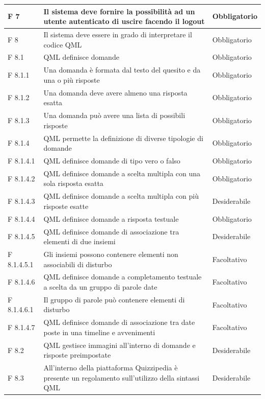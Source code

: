 \documentclass[a4paper,11pt]{article}
\begin{document}
\begin{longtable}{p{}p{}p{}}
\midrule
F 7 & Il sistema deve fornire la possibilità ad un utente autenticato di uscire facendo il logout & Obbligatorio\\
\midrule
F 8 & Il sistema deve essere in grado di interpretare il codice QML & Obbligatorio\\
\midrule
F 8.1 & QML definisce domande & Obbligatorio\\
\midrule
F 8.1.1 & Una domanda è formata dal testo del quesito e da una o più risposte & Obbligatorio\\
\midrule
F 8.1.2 & Una domanda deve avere almeno una risposta esatta & Obbligatorio\\
\midrule
F 8.1.3 & Una domanda può avere una lista di possibili risposte & Obbligatorio\\
\midrule
F 8.1.4 & QML permette la definizione di diverse tipologie di domande & Obbligatorio\\
\midrule
F 8.1.4.1 & QML definisce domande di tipo vero o falso & Obbligatorio\\
\midrule
F 8.1.4.2 & QML definisce domande a scelta multipla con una sola risposta esatta & Obbligatorio\\
\midrule
F 8.1.4.3 & QML definisce domande a scelta multipla con più risposte esatte & Desiderabile\\
\midrule
F 8.1.4.4 & QML definisce domande a risposta testuale & Obbligatorio\\
\midrule
F 8.1.4.5 & QML definisce domande di associazione tra elementi di due insiemi & Desiderabile\\
\midrule
F 8.1.4.5.1 & Gli insiemi possono contenere elementi non associabili di disturbo & Facoltativo\\
\midrule
F 8.1.4.6 & QML definisce domande a completamento testuale a scelta da un gruppo di parole date & Facoltativo\\
\midrule
F 8.1.4.6.1 & Il gruppo di parole può contenere elementi di disturbo & Facoltativo\\
\midrule
F 8.1.4.7 & QML definisce domande di associazione tra date poste in una timeline e avvenimenti & Facoltativo\\
\midrule
F 8.2 & QML gestisce immagini all'interno di domande e risposte preimpostate & Desiderabile\\
\midrule
F 8.3 & All'interno della piattaforma Quizzipedia è presente un regolamento sull'utilizzo della sintassi QML & Desiderabile\\			
			\end{longtable}
\end{document}
